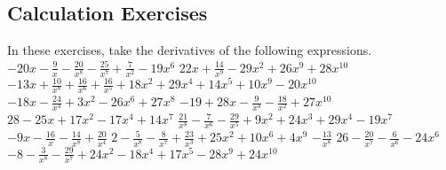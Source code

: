 \begin{exercises}
\subsection*{Calculation Exercises}
\noindent{}In these exercises, take the derivatives of the
following expressions.
\exercise [22] $\displaystyle - 20 x - \frac{9}{x} - \frac{20}{x^{8}} - \frac{25}{x^{7}} + \frac{7}{x^{2}} - 19 x^{6}$
\exercise [20] $\displaystyle 22 x + \frac{14}{x^{9}} - 29 x^{2} + 26 x^{9} + 28 x^{10}$
\exercise [28] $\displaystyle - 13 x + \frac{10}{x^{8}} + \frac{16}{x^{6}} + \frac{16}{x^{5}} + 18 x^{2} + 29 x^{4} + 14 x^{5} + 10 x^{9} - 20 x^{10}$
\exercise [20] $\displaystyle - 18 x - \frac{24}{x^{4}} + 3 x^{2} - 26 x^{6} + 27 x^{8}$
\exercise [19] $\displaystyle -19 + 28 x - \frac{9}{x^{4}} - \frac{18}{x^{2}} + 27 x^{10}$
\exercise [19] $\displaystyle 28 - 25 x + 17 x^{2} - 17 x^{4} + 14 x^{7}$
\exercise [24] $\displaystyle \frac{21}{x^{8}} - \frac{7}{x^{6}} - \frac{29}{x^{5}} + 9 x^{2} + 24 x^{3} + 29 x^{4} - 19 x^{7}$
\exercise [18] $\displaystyle - 9 x - \frac{16}{x} - \frac{14}{x^{8}} + \frac{20}{x^{4}}$
\exercise [23] $\displaystyle 2 - \frac{5}{x^{8}} - \frac{8}{x^{7}} + \frac{23}{x^{3}} + 25 x^{2} + 10 x^{6} + 4 x^{9}$
\exercise [12] $\displaystyle - \frac{13}{x^{8}}$
\exercise [17] $\displaystyle 26 - \frac{20}{x^{7}} - \frac{6}{x^{6}} - 24 x^{6}$
\exercise [25] $\displaystyle -8 - \frac{3}{x^{8}} - \frac{29}{x^{7}} + 24 x^{2} - 18 x^{4} + 17 x^{5} - 28 x^{9} + 24 x^{10}$
\begin{comment}
\exercise [23] $\displaystyle 25 - \frac{9}{x} - \frac{28}{x^{7}} + \frac{13}{x^{3}} + 10 x^{4} + 14 x^{6} + 23 x^{9}$
\exercise [14] $\displaystyle - \frac{23}{x} + 9 x^{10}$
\exercise [28] $\displaystyle - \frac{7}{x^{10}} + \frac{17}{x^{9}} + \frac{6}{x^{8}} + \frac{28}{x^{7}} + \frac{5}{x^{2}} - 30 x^{2} + 12 x^{4} + 26 x^{5} + 13 x^{10}$
\exercise [13] $\displaystyle -20 + 12 x^{2}$
\exercise [26] $\displaystyle 26 x - \frac{9}{x^{10}} + \frac{15}{x^{7}} - \frac{17}{x^{6}} + \frac{8}{x^{4}} - \frac{12}{x^{2}} + 26 x^{7} + 12 x^{9}$
\exercise [12] $\displaystyle 18 x^{8}$
\exercise [12] $\displaystyle - \frac{4}{x^{7}}$
\exercise [14] $\displaystyle \frac{7}{x^{5}} + 14 x^{5}$
\exercise [29] $\displaystyle 18 + 24 x - \frac{26}{x^{9}} - \frac{17}{x^{5}} + \frac{13}{x^{4}} - \frac{6}{x^{2}} + 12 x^{2} - 22 x^{7} + 20 x^{8} - 17 x^{9}$
\exercise [23] $\displaystyle 1 - \frac{4}{x} + \frac{17}{x^{10}} - \frac{14}{x^{7}} - \frac{11}{x^{2}} - 21 x^{2} + 19 x^{9}$
\exercise [17] $\displaystyle 11 + \frac{4}{x^{10}} + 13 x^{4} + 6 x^{8}$
\exercise [27] $\displaystyle -13 - \frac{28}{x} - \frac{7}{x^{10}} + \frac{25}{x^{4}} + 23 x^{3} - 21 x^{4} - 25 x^{6} - 20 x^{7} + 23 x^{8}$

\end{comment}
\end{exercises}
